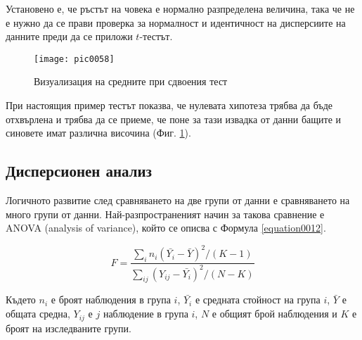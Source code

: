 Установено е, че ръстът на човека е нормално разпределена величина, така че не е нужно да се прави проверка за нормалност и идентичност на дисперсиите на данните преди да се приложи $t$-тестът. 

\begin{figure}[h!]
  \centering
  \texttt{[image: pic0058]}
  \caption{Визуализация на средните при сдвоения тест}
\label{figure0058}
\end{figure}
\FloatBarrier

При настоящия пример тестът показва, че нулевата хипотеза трябва да бъде отхвърлена и трябва да се приеме, че поне за тази извадка от данни бащите и синовете имат различна височина (Фиг. \ref{figure0058}). 

\subsection{Дисперсионен анализ}

Логичното развитие след сравняването на две групи от данни е сравняването на много групи от данни. Най-разпространеният начин за такова сравнение е ANOVA (analysis of variance), който се описва с Формула \ref{equation0012}.

\begin{equation}
F = \frac{ \sum_{i}^{}n_i(\bar{Y_i}-\bar{Y})^2 / (K-1) }{ \sum_{ij}^{}(Y_{ij}-\bar{Y_i})^2 / (N-K) }
\label{equation0012}
\end{equation}

Където $n_i$ е броят наблюдения в група $i$, $\bar{Y_i}$ е средната стойност на група $i$, $\bar{Y}$ е общата средна, $Y_{ij}$ е $j$ наблюдение в група $i$, $N$ е общият брой наблюдения и $K$ е броят на изследваните групи. 

